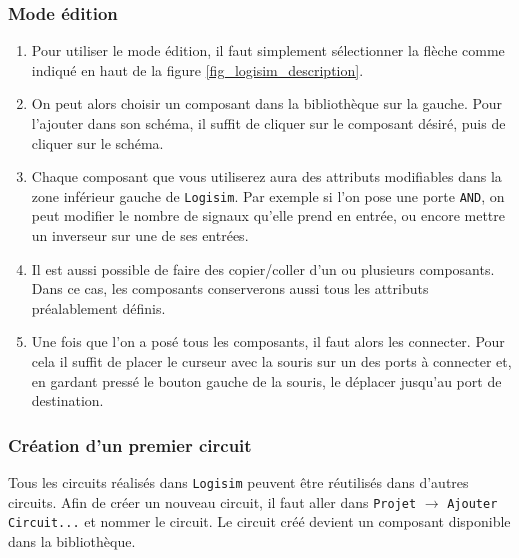 \subsubsection{Mode édition}
\begin{enumerate}
\item Pour utiliser le mode édition, il faut simplement sélectionner la flèche comme indiqué en haut de la figure
\ref{fig_logisim_description}.
\item On peut alors choisir un composant dans la bibliothèque sur la gauche. Pour l'ajouter dans son schéma, il suffit
de cliquer sur le composant désiré, puis de cliquer sur le schéma.

\item Chaque composant que vous utiliserez aura des attributs modifiables dans la zone inférieur gauche de
\texttt{Logisim}. Par exemple si l'on pose une porte \texttt{AND}, on peut modifier le nombre de signaux qu'elle prend en
entrée, ou encore mettre un inverseur sur une de ses entrées.

\item Il est aussi possible de faire des copier/coller d'un ou plusieurs composants. Dans ce cas, les composants
conserverons aussi tous les attributs préalablement définis.

\item Une fois que l'on a posé tous les composants, il faut alors les connecter. Pour cela il suffit de placer le curseur
avec la souris sur un des ports à connecter et, en gardant pressé le bouton
gauche de la souris, le déplacer jusqu'au port de destination.

\end{enumerate}

\subsubsection{Création d'un premier circuit}



\label{nouveauCircuit}
Tous les circuits réalisés dans \texttt{Logisim} peuvent être réutilisés dans d'autres circuits.
Afin de créer un nouveau circuit, il faut aller dans \texttt{Projet} $\rightarrow$ \texttt{Ajouter Circuit...} et nommer le circuit. Le circuit créé devient un composant disponible dans la bibliothèque.

